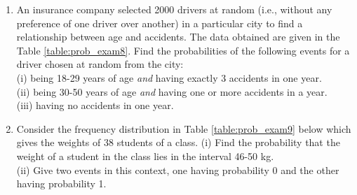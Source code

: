 \begin{enumerate}[label=\arabic*.,ref=\thesubsection.\theenumi]
\begin{table}[!ht]
\centering
{}
\caption{}
\label{table:prob_exam7}
\end{table}
\solution


\item An insurance company selected 2000 drivers at random (i.e., without
any preference of one driver over another) in a particular city to find a relationship between age and accidents. The data obtained are given in the Table \ref{table:prob_exam8}.
Find the probabilities of the following events for a driver chosen at random from the city:\\
(i) being 18-29 years of age \textit{and} having exactly 3 accidents in one year.\\
(ii) being 30-50 years of age \textit{and} having one or more accidents in a year.\\
(iii) having no accidents in one year.\\
\begin{table}[!ht]
\centering
{}
\caption{}
\label{table:prob_exam8}
\end{table}

\solution


\item Consider the frequency distribution in Table \ref{table:prob_exam9} below which gives the weights of 38 students of a class.
(i) Find the probability that the weight of a student in the class lies in the interval 46-50 kg.\\
(ii) Give two events in this context, one having probability 0 and the other having probability 1.


\end{enumerate}
